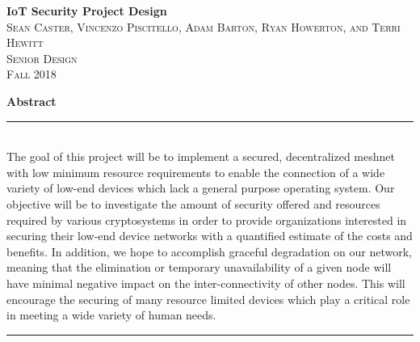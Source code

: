 \documentclass[tikz,a4paper,titlepage]{article}
\begin{document}
\begin{titlepage}
\vspace*{\fill}

\newcommand{\HRule}{\rule{\linewidth}{0.5mm}} %

\center %


{ \huge \bfseries IoT Security Project Design}\\[0.4cm] %


\textsc{\LARGE Sean Caster, Vincenzo Piscitello, Adam Barton, Ryan Howerton, and Terri Hewitt}\\[0.5cm] %
\textsc{\Large Senior Design}\\[0.5cm] %
\textsc{\large Fall 2018}\\[2.5cm] %


\begin{minipage}{0.8\textwidth}  %
\textbf{\large Abstract} \\
\HRule \\[0.4cm]
The goal of this project will be to implement a secured, decentralized meshnet with low minimum resource requirements to enable the connection of a wide variety of low-end devices which lack a general purpose operating system. Our objective will be to investigate the amount of security offered and resources required by various cryptosystems in order to provide organizations interested in securing their low-end device networks with a quantified estimate of the costs and benefits. In addition, we hope to accomplish graceful degradation on our network, meaning that the elimination or temporary unavailability of a given node will have minimal negative impact on the inter-connectivity of other nodes. This will encourage the securing of many resource limited devices which play a critical role in meeting a wide variety of human needs.
\\[0.4cm]
\HRule \\[1.5cm]
\end{minipage}


\end{titlepage}
\end{document}
